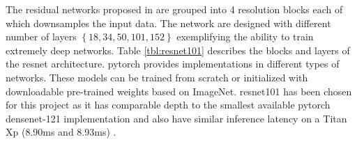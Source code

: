 The residual networks proposed in \cite{he_deep_2015} are grouped into 4 resolution blocks each of which downsamples the input data. The network are designed with different number of layers $ \left\{18, 34, 50, 101, 152\right\} $ exemplifying the ability to train extremely deep networks. Table \ref{tbl:resnet101} describes the blocks and layers of the \gls{resnet} architecture. \gls{pytorch} provides implementations in different types of networks. These models can be trained from scratch or initialized with downloadable pre-trained weights based on ImageNet. \gls{resnet}101 has been chosen for this project as it has comparable depth to the smallest available \gls{pytorch} \gls{densenet}-121 implementation and also have similar inference latency on a Titan Xp (8.90ms and 8.93ms) \cite{bianco_benchmark_2018}.

\small
